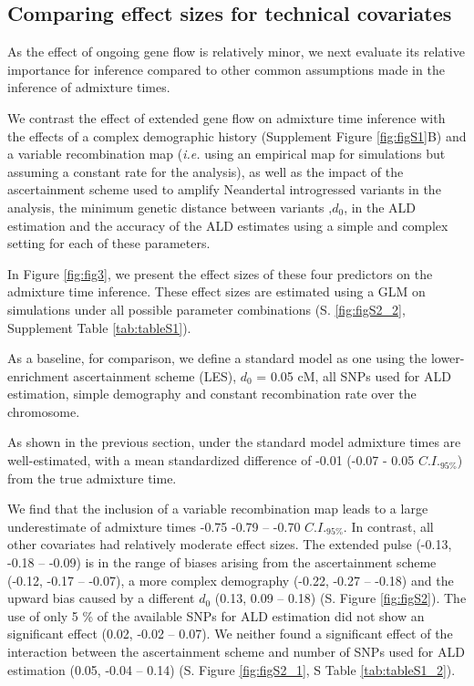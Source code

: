 \documentclass[11pt]{article}
\begin{document}
\subsection{Comparing effect sizes for technical covariates}\label{comparing effect sizes}

As the effect of ongoing gene flow is relatively minor, we next evaluate its relative importance for inference compared to other common assumptions made in the inference of admixture times. 

We contrast the effect of extended gene flow on admixture time inference with  the effects of a complex demographic history (Supplement Figure \ref{fig:figS1}B) and a variable recombination map (\emph{i.e.} using an empirical map for simulations but assuming a constant rate for the analysis), as well as the impact of the ascertainment scheme used to amplify Neandertal introgressed variants in the analysis, the minimum genetic distance between variants ,$d_0$, in the ALD estimation and the accuracy of the ALD estimates using a simple and complex setting for each of these parameters. 

In Figure \ref{fig:fig3}, we present the effect sizes of these four predictors on the admixture time inference. These effect sizes are estimated using a GLM on simulations under all possible parameter combinations  (S. \ref{fig:figS2_2}, Supplement Table \ref{tab:tableS1}).

As a baseline, for comparison, we define a standard model as one using the lower-enrichment ascertainment scheme (LES), $d_{0}$ = 0.05 cM, all SNPs used for ALD estimation, simple demography and constant recombination rate over the chromosome. 

As shown in the previous section, under the standard model admixture times are well-estimated, with a mean standardized difference of  -0.01 (-0.07 - 0.05 $C.I._{95\%}$) from the true
admixture time.

We find that the  inclusion of a variable recombination map leads to a large underestimate of admixture times -0.75 -0.79 -- -0.70 $C.I._{95\%}$. In contrast, all other covariates had relatively moderate effect sizes. The extended pulse   (-0.13,  -0.18 -- -0.09) is in the range of biases arising from the ascertainment scheme (-0.12, -0.17 --
-0.07), a more complex demography (-0.22, -0.27 -- -0.18) and the upward bias caused by a different $d_0$ (0.13, 0.09 --
0.18) (S. Figure \ref{fig:figS2}). The use of only 5 \% of the available SNPs for ALD estimation did not show an significant effect (0.02, -0.02 -- 0.07). We neither found a significant effect of the interaction between the ascertainment scheme and number of SNPs used for ALD estimation (0.05, -0.04 -- 0.14) (S. Figure \ref{fig:figS2_1}, S Table \ref{tab:tableS1_2}). 
\end{document}
